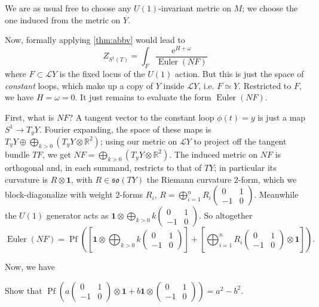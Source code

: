 \documentclass[12pt,letterpaper,reqno]{article}
\numberwithin{equation}{section}
\newcommand{\fso}{{\mathfrak {so}}}
\newcommand{\cL}{\ensuremath{\mathcal L}}
\newcommand{\R}{\ensuremath{\mathbb R}}
\newcommand{\e}{{\mathrm e}}
\newcommand{\bid}{{\mathbf 1}}
\newcommand{\ti}[1]{\textit{#1}}
\DeclareMathOperator{\Pf}{Pf}
\DeclareMathOperator{\Euler}{Euler}
\newcommand{\fixme}[1]{{\color{orange}{[#1]}}}
\begin{document}
We are as usual free to choose any $U(1)$-invariant metric on $M$; we choose the
one induced from the metric on $Y$.

Now, formally applying \autoref{thm:abbv} would lead to
\begin{equation} \label{eq:zs1-abbv-formal}
  Z_{S^1(T)} = \int_F \frac{\e^{H + \omega}}{\Euler(NF)}
\end{equation}
where $F \subset \cL Y$ is the fixed locus of the $U(1)$ action.
But this is just the space of \ti{constant} loops,
which make up a copy of $Y$ inside $\cL Y$, i.e. $F \simeq Y$.
Restricted to $F$, we have $H = \omega = 0$. It just 
remains to evaluate the form $\Euler(NF)$. 

First, what is $NF$?
A tangent vector to the constant loop $\phi(t) = y$
is just a map $S^1 \to T_y Y$. 
Fourier expanding, the space of these maps is
$T_y Y \oplus \bigoplus_{k > 0} (T_y Y \otimes \R^2)$; using our metric
on $\cL Y$ to project off the tangent bundle $TF$, 
we get $NF = \bigoplus_{k > 0} (T_y Y \otimes \R^2)$.
The induced metric on $NF$ is orthogonal and, in each summand,
restricts to that of $TY$; in particular its curvature is $R \otimes \bid$, 
with $R \in \fso(TY)$ the Riemann curvature $2$-form,
which we block-diagonalize with weight $2$-forms $R_i$,
$R = \bigoplus_{i=1}^n R_i \begin{pmatrix} 0 & 1 \\ -1 & 0 \end{pmatrix}$.
Meanwhile the $U(1)$ generator acts as
$\bid \otimes \bigoplus_{k>0} k \begin{pmatrix} 0 & 1 \\ -1 & 0 \end{pmatrix}$.
So altogether
\begin{equation}
  \Euler(NF) = \Pf \left( \left[ \bid \otimes \bigoplus_{k>0} k \begin{pmatrix} 0 & 1 \\ -1 & 0 \end{pmatrix} \right] +  \left[ \bigoplus_{i=1}^n R_i \begin{pmatrix} 0 & 1 \\ -1 & 0 \end{pmatrix} \otimes \bid \right] \right).
\end{equation}

Now, we have
\begin{exercise}
Show that $\Pf \left( a \begin{pmatrix} 0 & 1 \\ -1 & 0 \end{pmatrix} \otimes \bid + b \bid \otimes \begin{pmatrix} 0 & 1 \\ -1 & 0 \end{pmatrix} \right) = a^2 - b^2$.  \fixme{check signs}
\end{exercise}
\end{document}

